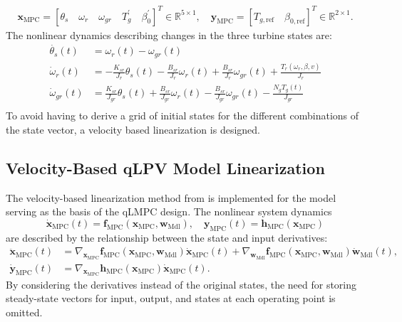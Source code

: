 \begin{align}\label{eq:xMPCyMPC}
    \bm{x}_{\text{MPC}} =[\theta_{s}  \quad {\omega}_r \quad {\omega}_{gr} \quad T_g^{\prime} \quad \beta_0^{\prime} ]^T  \in \mathbb{R}^{5 \times 1},   \quad \bm{y}_{\text{MPC}} = [T_{g,\text{ref}} \quad  {\beta}_{0,\text{ref}}]^T  \in \mathbb{R}^{2 \times 1}.
\end{align}
%
The nonlinear dynamics describing changes in the three turbine states are:
\begin{align}
    \dot{\theta_s}(t)&={\omega}_r(t)-{\omega}_{gr}(t) \label{eq:NLDyn1}\\
    \dot{\omega}_r(t)&=-\frac{K_{sr}}{J_r}\theta_s(t)-\frac{B_{sr}}{J_r}{\omega}_r(t)+\frac{B_{sr}}{J_r}{\omega}_{gr}(t)+\frac{T_r({\omega}_r, \beta, v)}{J_r}\\
    \dot{\omega}_{gr}(t)&=\frac{K_{sr}}{J_{gr}}\theta_s(t)+\frac{B_{sr}}{J_{gr}}{\omega}_r(t)-\frac{B_{sr}}{J_{gr}}{\omega}_{gr}(t)-\frac{N_gT_g(t)}{J_{gr}} \label{eq:NLDyn3} \\
\end{align}
%
To avoid having to derive a grid of initial states for the different combinations of the state vector, a velocity based linearization is designed.
\subsection{Velocity-Based qLPV Model Linearization}
The velocity-based linearization method from \cite{cisneros2020velocity} is implemented for the model serving as the basis of the qLMPC design. The nonlinear system dynamics
\[
\dot{\bm{x}}_{\text{MPC}}(t) = \bm{f}_{\text{MPC}}(\bm{x}_{\text{MPC}}, \bm{w}_{\text{Mdl}}), \quad \bm{y}_{\text{MPC}}(t) = \bm{h}_{\text{MPC}}(\bm{x}_{\text{MPC}})
\]
are described by the relationship between the state and input derivatives: 
\begin{align*}
    \ddot{\bm{x}}_{\text{MPC}}(t) &= \nabla_{\bm{x}_{\text{MPC}}} \bm{f}_{\text{MPC}}(\bm{x}_{\text{MPC}}, \bm{w}_{\text{Mdl}}) \dot{\bm{x}}_{\text{MPC}}(t) + \nabla_{\bm{w}_{\text{Mdl}}}\bm{f}_{\text{MPC}}(\bm{x}_{\text{MPC}}, \bm{w}_{\text{Mdl}}) \dot{\bm{w}}_{\text{Mdl}}(t),\\
    \dot{\bm{y}}_{\text{MPC}}(t) &= \nabla_{\bm{x}_{\text{MPC}}}\bm{h}_{\text{MPC}}(\bm{x}_{\text{MPC}}) \dot{\bm{x}}_{\text{MPC}}(t).   
\end{align*}
By considering the derivatives instead of the original states, the need for storing steady-state vectors for input, output, and states at each operating point is omitted.
%

